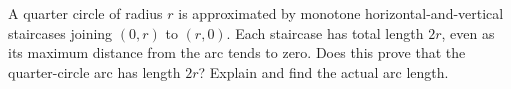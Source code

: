 A quarter circle of radius $r$ is approximated by monotone horizontal-and-vertical staircases joining $(0,r)$ to $(r,0)$. Each staircase has total length $2r$, even as its maximum distance from the arc tends to zero. Does this prove that the quarter-circle arc has length $2r$? Explain and find the actual arc length.
